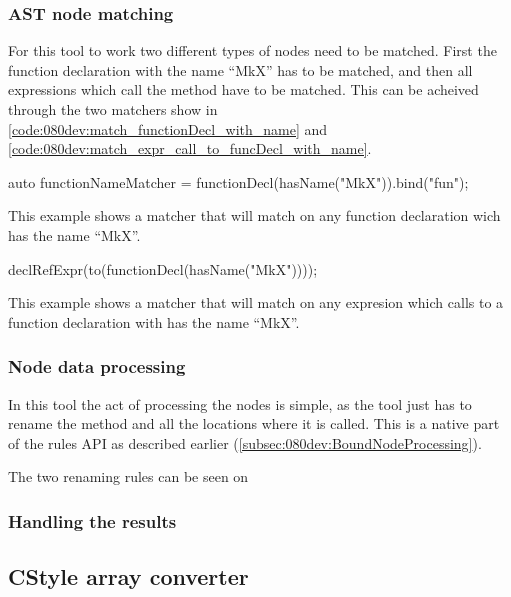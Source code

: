 \subsubsection*{AST node matching}

For this tool to work two different types of nodes need to be matched. First the function declaration with the name ``MkX'' has to be matched, and then all expressions which call the method have to be matched. This can be acheived through the two matchers show in \cref{code:080dev:match_functionDecl_with_name} and \cref{code:080dev:match_expr_call_to_funcDecl_with_name}.

\begin{listing}[H]
    \begin{cppcode}
auto functionNameMatcher = functionDecl(hasName("MkX")).bind("fun");
    \end{cppcode}
    \caption{This example shows a matcher that will match on any function declaration wich has the name ``MkX''.}
    \label{code:080dev:match_functionDecl_with_name}
\end{listing}

\begin{listing}[H]
    \begin{cppcode}
declRefExpr(to(functionDecl(hasName("MkX"))));
    \end{cppcode}
    \caption{This example shows a matcher that will match on any expresion which calls to a function declaration with has the name ``MkX''.}
    \label{code:080dev:match_expr_call_to_funcDecl_with_name}
\end{listing}

\subsubsection*{Node data processing}

In this tool the act of processing the nodes is simple, as the tool just has to rename the method and all the locations where it is called. This is a native part of the rules API as described earlier (\cref{subsec:080dev:BoundNodeProcessing}). 

The two renaming rules can be seen on 

\begin{listing}[H]
    \begin{cppcode}
    
    \end{cppcode}
    \caption{}
    \label{}
\end{listing}

\begin{listing}[H]
    \begin{cppcode}
    
    \end{cppcode}
    \caption{}
    \label{}
\end{listing}


\subsubsection*{Handling the results}


\subsection{CStyle array converter}